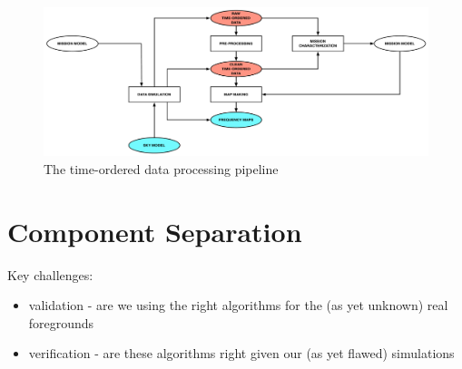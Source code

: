 \begin{figure}[htbp]
\centering
\includegraphics[width=1\textwidth]{tod}
\caption{The time-ordered data processing pipeline}
\label{default}

\end{figure}

\newpage

\section{Component Separation}

Key challenges:
\begin{itemize}
\item validation - are we using the right algorithms for the (as yet unknown) real foregrounds
\item verification - are these algorithms right given our (as yet flawed) simulations
\end{itemize}

